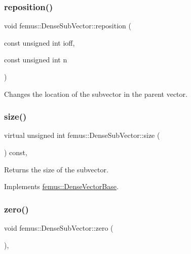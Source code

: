 \subsubsection{\texorpdfstring{reposition()}{reposition()}}
{\footnotesize\ttfamily void femus\+::\+Dense\+Sub\+Vector\+::reposition (\begin{DoxyParamCaption}\item[{const unsigned int}]{ioff,  }\item[{const unsigned int}]{n }\end{DoxyParamCaption})\hspace{0.3cm}{\ttfamily [inline]}}



Changes the location of the subvector in the parent vector. 

\mbox{\label{classfemus_1_1_dense_sub_vector_ac7267bc849d12ec7c84481a9fa9a87ce}} 
\subsubsection{\texorpdfstring{size()}{size()}}
{\footnotesize\ttfamily virtual unsigned int femus\+::\+Dense\+Sub\+Vector\+::size (\begin{DoxyParamCaption}{ }\end{DoxyParamCaption}) const\hspace{0.3cm}{\ttfamily [inline]}, {\ttfamily [virtual]}}

\begin{DoxyReturn}{Returns}
the size of the subvector. 
\end{DoxyReturn}


Implements \mbox{\hyperlink{classfemus_1_1_dense_vector_base_a642849a48ad4800945952af17c1e30c9}{femus\+::\+Dense\+Vector\+Base}}.

\mbox{\label{classfemus_1_1_dense_sub_vector_a20fd1054159ce0a69af4d28199dd704f}} 
\subsubsection{\texorpdfstring{zero()}{zero()}}
{\footnotesize\ttfamily void femus\+::\+Dense\+Sub\+Vector\+::zero (\begin{DoxyParamCaption}{ }\end{DoxyParamCaption})\hspace{0.3cm}{\ttfamily [inline]}, {\ttfamily [virtual]}}



